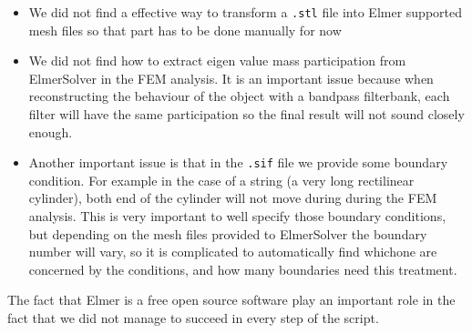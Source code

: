 \begin{itemize}
    \item We did not find a effective way to transform a \texttt{.stl} file into Elmer supported mesh files so that part has to be done manually for now
    \item We did not find how to extract eigen value mass participation from ElmerSolver in the FEM analysis. It is an important issue because when reconstructing the behaviour of the object with a bandpass filterbank, each filter will have the same participation so the final result will not sound closely enough.
    \item Another important issue is that in the \texttt{.sif} file we provide some boundary condition. For example in the case of a string (a very long rectilinear cylinder), both end of the cylinder will not move during during the FEM analysis. This is very important to well specify those boundary conditions, but depending on the mesh files provided to ElmerSolver the boundary number will vary, so it is complicated to automatically find whichone are concerned by the conditions, and how many boundaries need this treatment.
\end{itemize}

The fact that Elmer is a free open source software play an important role in the fact that we did not manage to succeed in every step of the script.
